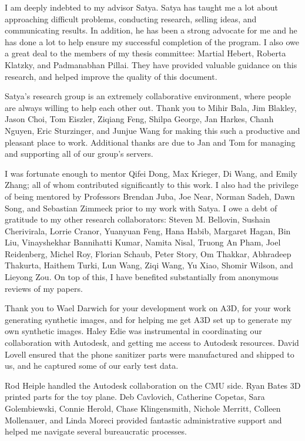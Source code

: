 \documentclass[12pt]{cmuthesis}
\begin{document}
\begin{acknowledgments}
  I am deeply indebted to my advisor Satya.
  Satya has taught me a lot about approaching difficult problems, conducting
  research, selling ideas, and communicating results.
  In addition, he has been a strong advocate for me and he has done a lot to
  help ensure my successful completion of the program.
  I also owe a great deal to the members of my thesis committee: Martial Hebert,
  Roberta Klatzky, and Padmanabhan Pillai.
  They have provided valuable guidance on this research, and helped improve the
  quality of this document.

  Satya's research group is an extremely collaborative environment, where
  people are always willing to help each other out.
  Thank you to Mihir Bala, Jim Blakley, Jason Choi, Tom Eiszler, Ziqiang Feng,
  Shilpa George, Jan Harkes, Chanh Nguyen, Eric Sturzinger, and Junjue Wang
  for making this such a productive and pleasant place to work.
  Additional thanks are due to Jan and Tom for managing and supporting all of
  our group's servers.

  I was fortunate enough to mentor Qifei Dong, Max Krieger, Di Wang, and Emily
  Zhang; all of whom contributed significantly to this work.
  I also had the privilege of being mentored by Professors Brendan Juba,
  Joe Near, Norman Sadeh, Dawn Song, and Sebastian Zimmeck prior to my work with
  Satya.
  I owe a debt of gratitude to my other research collaborators:
  Steven M. Bellovin, Sushain Cherivirala, Lorrie Cranor, Yuanyuan Feng, Hana
  Habib, Margaret Hagan, Bin Liu, Vinayshekhar Bannihatti Kumar, Namita Nisal,
  Truong An Pham, Joel Reidenberg, Michel Roy, Florian Schaub, Peter Story,
  Om Thakkar, Abhradeep Thakurta, Haithem Turki, Lun Wang, Ziqi Wang, Yu Xiao,
  Shomir Wilson, and Lieyong Zou.
  On top of this, I have benefited substantially from anonymous reviews of my
  papers.

  Thank you to Wael Darwich for your development work on A3D, for your work
  generating synthetic images, and for helping me get A3D set up to generate my
  own synthetic images.
  Haley Edie was instrumental in coordinating our collaboration with Autodesk,
  and getting me access to Autodesk resources.
  David Lovell ensured that the phone sanitizer parts were manufactured and
  shipped to us, and he captured some of our early test data.

  Rod Heiple handled the Autodesk collaboration on the CMU side.
  Ryan Bates 3D printed parts for the toy plane.
  Deb Cavlovich, Catherine Copetas, Sara Golembiewski, Connie Herold,
  Chase Klingensmith, Nichole Merritt, Colleen Mollenauer, and Linda Moreci
  provided fantastic administrative support and helped me navigate several
  bureaucratic processes.


\end{acknowledgments}
\end{document}

